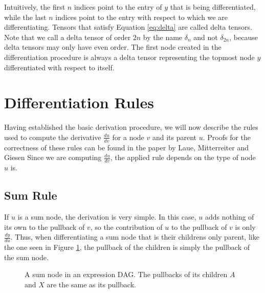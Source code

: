 \documentclass[12pt, a4paper]{report}
\begin{document}
Intuitively, the first $n$ indices point to the entry of $y$ that is being differentiated, while the last $n$ indices point to the entry with respect to which we are differentiating.
Tensors that satisfy Equation \ref{eq:delta} are called delta tensors.
Note that we call a delta tensor of order $2n$ by the name $\delta_n$ and not $\delta_{2n}$, because delta tensors may only have even order.
The first node created in the differentiation procedure is always a delta tensor representing the topmost node $y$ differentiated with respect to itself.

\section{Differentiation Rules}
Having established the basic derivation procedure, we will now describe the rules used to compute the derivative $\frac{du}{dv}$ for a node $v$ and its parent $u$.
Proofs for the correctness of these rules can be found in the paper by Laue, Mitterreiter and Giesen %
Since we are computing $\frac{du}{dv}$, the applied rule depends on the type of node $u$ is.

\subsection{Sum Rule}
If $u$ is a sum node, the derivation is very simple.
In this case, $u$ adds nothing of its own to the pullback of $v$, so the contribution of $u$ to the pullback of $v$ is only $\frac{dy}{du}$.
Thus, when differentiating a sum node that is their childrens only parent, like the one seen in Figure \ref{fig:sum_rule}, the pullback of the children is simply the pullback of the sum node.

\begin{figure}
    \centering
    \caption{A sum node in an expression DAG. The pullbacks of its children $A$ and $X$ are the same as its pullback.}
    \label{fig:sum_rule}
\end{figure}
\end{document}
